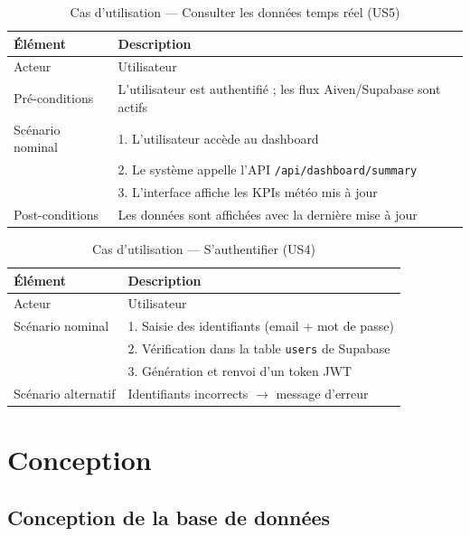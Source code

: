 \documentclass[a4paper,12pt,oneside]{report}
\begin{document}
\begin{table}[H]
\centering
\caption{Cas d'utilisation — Consulter les données temps réel (US5)}
\label{tab:uc_dashboard}
\begin{tabularx}{\textwidth}{lX}
\toprule
\textbf{Élément} & \textbf{Description} \\
\midrule
Acteur         & Utilisateur \\
Pré-conditions & L'utilisateur est authentifié ; les flux Aiven/Supabase sont actifs \\
Scénario nominal & 1. L'utilisateur accède au dashboard \\
               & 2. Le système appelle l'API \texttt{/api/dashboard/summary} \\
               & 3. L'interface affiche les KPIs météo mis à jour \\
Post-conditions & Les données sont affichées avec la dernière mise à jour \\
\bottomrule
\end{tabularx}
\end{table}

\begin{table}[H]
\centering
\caption{Cas d'utilisation — S'authentifier (US4)}
\label{tab:uc_auth}
\begin{tabularx}{\textwidth}{lX}
\toprule
\textbf{Élément} & \textbf{Description} \\
\midrule
Acteur         & Utilisateur \\
Scénario nominal & 1. Saisie des identifiants (email + mot de passe) \\
               & 2. Vérification dans la table \texttt{users} de Supabase \\
               & 3. Génération et renvoi d'un token JWT \\
Scénario alternatif & Identifiants incorrects $\rightarrow$ message d'erreur \\
\bottomrule
\end{tabularx}
\end{table}

\section{Conception}

\subsection{Conception de la base de données}
\end{document}
